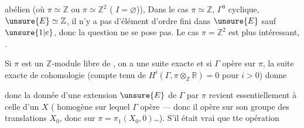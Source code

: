 

abélien (où \(\pi\simeq\mathbb Z\)
ou \(\pi\simeq\mathbb Z^2\) ( \(I=\varnothing\))),
Dans le  cas
 \(\pi\simeq\mathbb Z\),
\(\Gamma^0\) cyclique, \(\unsure{E}\simeq\mathbb Z\),
il n'y a pas d'élément d'ordre fini dans \(\unsure{E}\) sauf
\(\unsure{1|e}\), donc la question ne se pose pas.
Le cas \(\pi=\mathbb Z^2\) est plus intéressant,
.

Si \(\pi\) est un \(\mathbb Z\)-module libre de
, on a une suite exacte
et si \(\Gamma\) opère sur \(\pi\), la suite exacte de cohomologie
(compte tenu de \(H^i(\Gamma,\pi\otimes_{\mathbb Z}\mathbb R)=0\)
pour \(i>0\)) donne

donc la donnée d'une extension \(\unsure{E}\) de \(\Gamma\) par \(\pi\)
revient essentiellement à celle d'un
 \(X\)
( homogène sur lequel \(\Gamma\) opère --- donc il opère
sur son groupe des translations \(X_0\), donc sur
\(\pi=\pi_1(X_0,0)\)\ldots).
S'il était vrai  que tte opération

